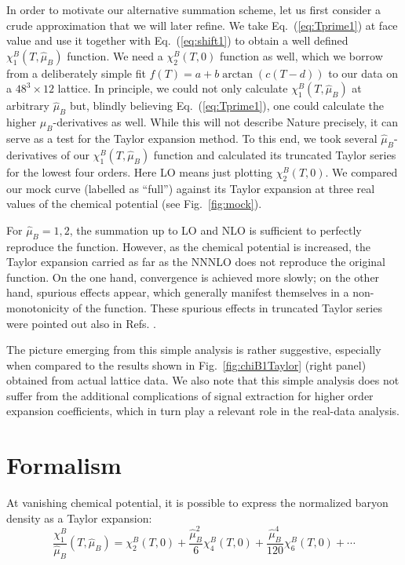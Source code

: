 \documentclass[aps,prd,twocolumn,superscriptaddress]{revtex4-2}
\newcommand{\beq}{\begin{equation}}
\newcommand{\eeq}{\end{equation}}
\newcommand \hmu {\hat{\mu}}
\newcommand{\lat}[2]{{{#1}^3\!\!\times\!\!{#2}}}
\begin{document}
In order to motivate our alternative summation 
scheme, let us first consider a crude approximation
that we will later refine.
We take Eq.~(\ref{eq:Tprime1}) at face value and use it
together with Eq.~(\ref{eq:shift1}) to obtain a well defined
$\chi^B_1(T,\hmu_B)$ function. We need a $\chi^B_2(T,0)$
function as well, which we borrow from a deliberately
simple fit $f(T) = a + b \arctan(c(T-d))$ to our data
on a $\lat{48}{12}$ lattice. In principle, we could 
not only calculate $\chi^B_1(T,\hmu_B)$ at arbitrary 
$\hmu_B$ but, blindly believing Eq.~(\ref{eq:Tprime1}),
one could calculate the higher $\mu_B$-derivatives as well.
While this will not describe Nature precisely, it can
serve as a test for the Taylor expansion method.
To this end, we took several $\hmu_B$-derivatives of our
$\chi^B_1(T,\hmu_B)$ function and calculated its
truncated Taylor series for the lowest four orders.
Here LO means just plotting $\chi^B_2(T,0)$.
We compared our mock curve (labelled as ``full'') against 
its Taylor expansion at three real values of the chemical
potential (see Fig.~\ref{fig:mock}).

For $\hmu_B=1,2$, the summation up to LO and NLO
is sufficient to perfectly reproduce the function. 
However, as the chemical potential is increased, the 
Taylor expansion carried as far as the NNNLO does not 
reproduce the original function. On the one hand, 
convergence is achieved more slowly; on the other
hand, spurious effects appear, which generally manifest themselves
in a non-monotonicity of the function. These spurious effects in truncated Taylor series were pointed out also in Refs. \cite{Ratti:2007jf,Critelli:2017oub,Parotto:2018pwx}.

The picture emerging from this simple analysis is 
rather suggestive, especially when compared to the 
results shown in Fig.~\ref{fig:chiB1Taylor} (right panel)
obtained from actual lattice data. We also note that
this simple analysis does not suffer from the additional
complications of signal extraction for higher order 
expansion coefficients, which in turn play a relevant 
role in the real-data analysis.


\section{Formalism \label{sec:formalism}}

At vanishing chemical potential, it is possible to express the 
normalized baryon density as a Taylor expansion:
\beq  \label{eq:defin_1}
\frac{\chi_1^B}{\hmu_B} (T,\hmu_B) = \chi_2^B 
(T, 0) + \frac{\hmu_B^2}{6} \chi_4^B(T, 0) + \frac{\hmu_B^4}{120} \chi_6^B (T,0) + \cdots
\eeq 
\end{document}
